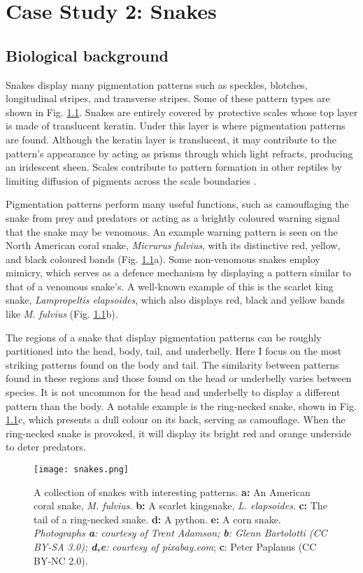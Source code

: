 \chapter{Case Study 2: Snakes}
\section{Biological background}
Snakes display many pigmentation patterns such as speckles, blotches, longitudinal stripes, and transverse stripes. Some of these pattern types are shown in Fig. \ref{fig:realSnakePatterns}. Snakes are entirely covered by protective scales whose top layer is made of translucent keratin. Under this layer is where pigmentation patterns are found. Although the keratin layer is translucent, it may contribute to the pattern's appearance by acting as prisms through which light refracts, producing an iridescent sheen. Scales contribute to pattern formation in other reptiles by limiting diffusion of pigments across the scale boundaries \citep{manukyan2017}.

Pigmentation patterns perform many useful functions, such as camouflaging the snake from prey and predators or acting as a brightly coloured warning signal that the snake may be venomous. An example warning pattern is seen on the North American coral snake, \textit{Micrurus fulvius}, with its distinctive red, yellow, and black coloured bands (Fig. \ref{fig:realSnakePatterns}a). Some non-venomous snakes employ mimicry, which serves as a defence mechanism by displaying a pattern similar to that of a venomous snake's. A well-known example of this is the scarlet king snake, \textit{Lampropeltis elapsoides}, which also displays red, black and yellow bands like \textit{M. fulvius} (Fig. \ref{fig:realSnakePatterns}b).

The regions of a snake that display pigmentation patterns can be roughly partitioned into the head, body, tail, and underbelly. Here I focus on the most striking patterns found on the body and tail. The similarity between patterns found in these regions and those found on the head or underbelly varies between species. It is not uncommon for the head and underbelly to display a different pattern than the body. A notable example is the ring-necked snake, shown in Fig. \ref{fig:realSnakePatterns}c, which presents a dull colour on its back, serving as camouflage. When the ring-necked snake is provoked, it will display its bright red and orange underside to deter predators.

\begin{figure}[hb]
	\centering
	\texttt{[image: snakes.png]}
	\caption{A collection of snakes with interesting patterns. \textbf{a:} An American coral snake, \textit{M. fulvius}. \textbf{b:} A scarlet kingsnake, \textit{L. elapsoides}. \textbf{c:} The tail of a ring-necked snake. \textbf{d:} A python. \textbf{e:} A corn snake. \textit{Photographs \textbf{a}: courtesy of Trent Adamson; \textbf{b}: Glenn Bartolotti (CC BY-SA 3.0); \textbf{d,e}: courtesy of pixabay.com}; \textbf{c}: Peter Paplanus (CC BY-NC 2.0).}
	\label{fig:realSnakePatterns}
\end{figure}

